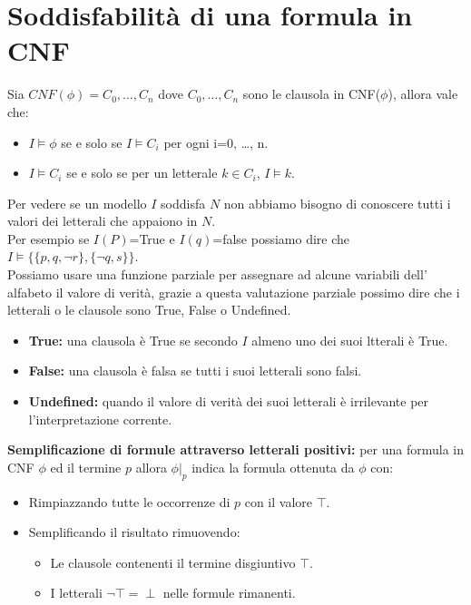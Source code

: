 \documentclass[../main.tex]{subfiles}
\begin{document}
    \section{Soddisfabilità di una formula in CNF}
    Sia $CNF(\phi)=C_0, \dots ,C_n$ dove $C_0,\dots ,C_n$ sono le clausola in CNF($\phi$), allora vale che:
    \begin{itemize}
        \item $I \models \phi$ se e solo se $I \models C_i$ per ogni i=0, \dots, n.
        \item $I \models C_i$ se e solo se per un letterale $k \in C_i$, $I \models k$.
    \end{itemize}
    Per vedere se un modello $I$ soddisfa $N$ non abbiamo bisogno di conoscere tutti i valori dei letterali che appaiono in $N$.\\
    Per esempio se $I(P)$=True e $I(q)$=false possiamo dire che $I \models \{\{p, q, \lnot r\}, \{\lnot q, s\}\}$.\\
    Possiamo usare una funzione parziale per assegnare ad alcune variabili dell' alfabeto il valore di verità, grazie a questa valutazione parziale possimo dire che i letterali o le clausole sono True, False o Undefined.
    \begin{itemize}
        \item \textbf{True:} una clausola è True se secondo $I$ almeno uno dei suoi ltterali è True.
        \item \textbf{False:} una clausola è falsa se tutti i suoi letterali sono falsi.
        \item \textbf{Undefined:} quando il valore di verità dei suoi letterali è irrilevante per l'interpretazione corrente.
    \end{itemize}
    \textbf{Semplificazione di formule attraverso letterali positivi:} per una formula in CNF $\phi$ ed il termine $p$ allora $\phi |_p$ indica la formula ottenuta da $\phi$ con:
    \begin{itemize}
        \item Rimpiazzando tutte le occorrenze di $p$ con il valore $\top$.
        \item Semplificando il risultato rimuovendo:
        \begin{itemize}
            \item Le clausole contenenti il termine disgiuntivo $\top$.
            \item I letterali $\lnot \top = \perp$ nelle formule rimanenti.
        \end{itemize}
    \end{itemize}
\end{document}
